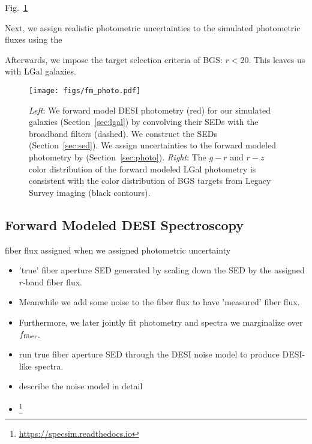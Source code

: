 Fig.~\ref{fig:photo}

Next, we assign realistic photometric uncertainties to the simulated
photometric fluxes using the  


Afterwards, we impose the target selection criteria of BGS: $r < 20$. 
This leaves us with  LGal galaxies. 

\begin{figure}
\begin{center}
\texttt{[image: figs/fm\_photo.pdf]}
\caption{{\em Left}: We forward model DESI photometry (red) for our simulated
    galaxies (Section~\ref{sec:lgal}) by convolving their SEDs with the
    broadband filters (dashed).  We construct the SEDs  (Section~\ref{sec:sed}).  We assign
    uncertainties to the forward modeled photometry by  (Section~\ref{sec:photo}).
    {\em Right}: The $g-r$ and $r-z$ color distribution of the forward modeled
    {\sc LGal} photometry is consistent with the color distribution of BGS
    targets from Legacy Survey imaging (black contours).} \label{fig:photo}
\end{center}
\end{figure}

\subsection{Forward Modeled DESI Spectroscopy} \label{sec:spec}
fiber flux assigned when we assigned photometric uncertainty

\begin{itemize} 
    \item 'true' fiber aperture SED generated by scaling down the SED by the 
    assigned $r$-band fiber flux. 
    \item Meanwhile we add some noise to the fiber flux to have
    'measured' fiber flux. 
    \item Furthermore, we later jointly fit photometry and spectra we marginalize over $f_{\rm fiber}$.
    \item run true fiber aperture SED through the DESI noise model to produce DESI-like spectra. 
    \item describe the noise model in detail 
    \item \footnote{\href{https://specsim.readthedocs.io/en/stable/guide.html}{https://specsim.readthedocs.io}}
\end{itemize}


